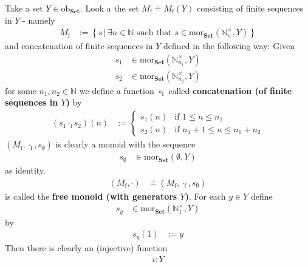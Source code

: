 \begin{exa}
\label{exa:freemon}
Take a set $Y \in \mathrm{ob}_{\mathbf{Set}}$. Look a the set $M_{\textrm{f}} \doteq M_{\textrm{f}}(Y)$ consisting of finite sequences in $Y$ - namely
\begin{align*}
  M_{\textrm{f}}
  &:=
  \left\lbrace
      s
    \,
    \vert
    \,
      \exists
      n
      \in
      \mathbb{N}
      \text{ such that }
      s
      \in
      \mathrm{mor}_{\mathbf{Set}}(\mathbb{N}_{n}^{\times},Y)
  \right\rbrace
\end{align*}
and concatenation of finite sequences in $Y$ defined in the following way: Given
\begin{align*}
  s_{1}
  &\in
  \mathrm{mor}_{\mathbf{Set}}(\mathbb{N}_{n_{1}}^{\times},Y)
  \\
  s_{2}
  &\in
  \mathrm{mor}_{\mathbf{Set}}(\mathbb{N}_{n_{2}}^{\times},Y)
\end{align*}
for some $n_{1},n_{2} \in \mathbb{N}$ we define a function $\circ_{\textrm{f}}$ called \textbf{concatenation (of finite sequences in $Y$)} by
\begin{align*}
  \left(
    s_{1}
    \cdot_{\textrm{f}}
    s_{2}
  \right)
  (n)
  &:=
  \begin{cases}
    s_{1}(n)
    &
    \text{if }
    1
    \leq
    n
    \leq
    n_{1}
    \\
    s_{2}(n)
    &
    \text{if }
    n_{1}
    +
    1
    \leq
    n
    \leq
    n_{1}
    +
    n_{2}
  \end{cases}
\end{align*}
$(M_{\textrm{f}},\cdot_{\textrm{f}},s_{\emptyset})$ is clearly a monoid with the sequence
\begin{align*}
  s_{\emptyset}
  &\in
  \mathrm{mor}_{\mathbf{Set}}(\emptyset,Y)
\end{align*}
as identity.
\begin{align*}
  (M_{\textrm{f}},\cdot)
  &\doteq
  (M_{\textrm{f}},\cdot_{\textrm{f}},s_{\emptyset})
\end{align*}
is called the \textbf{free monoid (with generators $Y$)}. For each $y \in Y$ define
\begin{align*}
  s_{y}
  &\in
  \mathrm{mor}_{\mathbf{Set}}(\mathbb{N}_{1}^{\times},Y)
\end{align*}
by
\begin{align*}
  s_{y}(1)
  &:=
  y
\end{align*}
Then there is clearly an (injective) function
\begin{align*}
  i
  \colon
  Y

\end{align*}
\end{exa}
